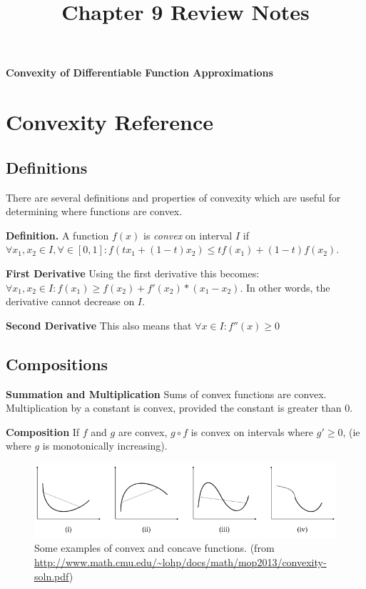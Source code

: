\documentclass[11pt]{article}
\theoremstyle{definition}
\begin{document}
\setcounter{section}{8}
\title{Chapter 9 Review Notes}

\thispagestyle{empty}

\begin{center}
{\LARGE \bf Convexity of Differentiable Function Approximations}\\
\end{center}
\section{Convexity Reference}

\subsection{Definitions}

There are several definitions and properties of convexity which are useful for determining where functions are convex.

\textbf{Definition.} A function $f(x)$ is \textit{convex} on interval $I$ if $\forall x_1, x_2 \in I, \forall \in [0, 1]: f(t x_1 + (1-t)x_2) \leq tf(x_1) + (1-t)f(x_2)$. 

\textbf{First Derivative} Using the first derivative this becomes: $\forall x_1, x_2 \in I: f(x_1) \geq f(x_2) + f'(x_2)*(x_1 - x_2)$. In other words, the derivative cannot decrease on $I$. 

\textbf{Second Derivative} This also means that $\forall x \in I: f''(x) \geq 0$

\subsection{Compositions}

\textbf{Summation and Multiplication} Sums of convex functions are convex. Multiplication by a constant is convex, provided the constant is greater than 0.

\textbf{Composition} If $f$ and $g$ are convex, $g \circ f$ is convex on intervals where $g' \geq 0$, (ie where $g$ is monotonically increasing).

\begin{figure}[h!]
  \centering
  \includegraphics[width=\linewidth]{figs/convex_examples.png}
  \caption{Some examples of convex and concave functions. (from \protect\url{http://www.math.cmu.edu/~lohp/docs/math/mop2013/convexity-soln.pdf})}
\end{figure}
\end{document}
